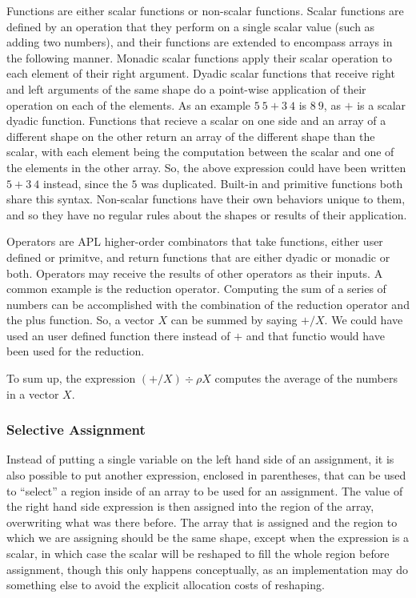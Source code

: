 Functions are either scalar functions or non-scalar functions. Scalar 
functions are defined by an operation that they perform on a single scalar 
value (such as adding two numbers), and their functions are extended to 
encompass arrays in the following manner. Monadic scalar functions 
apply their scalar operation to each element of their right argument.
Dyadic scalar functions that receive right and left arguments of the same 
shape do a point-wise application of their operation on each of the elements. 
As an example $5\ 5 + 3\ 4$ is $8\ 9$, as $+$ is a scalar dyadic function.
Functions that recieve a scalar on one side and an array of a different shape 
on the other return an array of the different shape than the scalar, with 
each element being the computation between the scalar and one of the elements 
in the other array. So, the above expression could have been written 
$5+3\ 4$ instead, since the $5$ was duplicated. Built-in and primitive 
functions both share this syntax. Non-scalar functions have their own 
behaviors unique to them, and so they have no regular rules about the shapes 
or results of their application.

Operators are APL higher-order combinators that take functions, either 
user defined or primitve, and return functions that are either dyadic or 
monadic or both. Operators may receive the results of other operators
as their inputs. A common example is the reduction operator.
Computing the sum of a series of numbers can be accomplished with 
the combination of the reduction operator and the plus function. 
So, a vector $X$ can be summed by saying $+/X$. We could have used 
an user defined function there instead of $+$ and that functio would have 
been used for the reduction.

To sum up, the expression $(+/X)\div\rho X$ computes the average of 
the numbers in a vector $X$.

\subsubsection{Selective Assignment}

Instead of putting a single variable on the left hand side of an assignment, 
it is also possible to put another expression, enclosed in parentheses, 
that can be used to ``select'' a region inside of an array to be used for 
an assignment. The value of the right hand side expression is then assigned 
into the region of the array, overwriting what was there before. The 
array that is assigned and the region to which we are assigning should be 
the same shape, except when the expression is a scalar, in which case the 
scalar will be reshaped to fill the whole region before assignment, 
though this only happens conceptually, as an implementation may do something
else to avoid the explicit allocation costs of reshaping.

